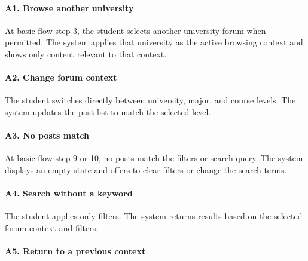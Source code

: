 \documentclass[12pt]{article}
\begin{document}
\hypertarget{sec:a1-browse-another-university}{}
\paragraph*{A1. Browse another university}
\par\medskip

At basic flow step 3, the student selects another university forum when permitted. The system applies that university as the active browsing context and shows only content relevant to that context.
\par\medskip

\hypertarget{sec:a2-change-forum-context}{}
\paragraph*{A2. Change forum context}
\par\medskip

The student switches directly between university, major, and course levels. The system updates the post list to match the selected level.
\par\medskip

\hypertarget{sec:a3-no-posts-match}{}
\paragraph*{A3. No posts match}
\par\medskip

At basic flow step 9 or 10, no posts match the filters or search query. The system displays an empty state and offers to clear filters or change the search terms.
\par\medskip

\hypertarget{sec:a4-search-without-a-keyword}{}
\paragraph*{A4. Search without a keyword}
\par\medskip

The student applies only filters. The system returns results based on the selected forum context and filters.
\par\medskip

\hypertarget{sec:a5-return-to-a-previous-context}{}
\paragraph*{A5. Return to a previous context}
\par\medskip
\end{document}

